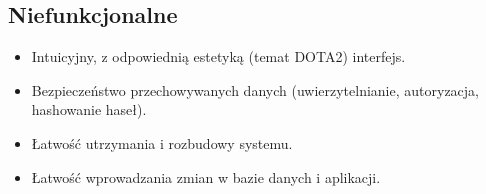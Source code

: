 \subsection{Niefunkcjonalne}
\begin{itemize}
    \item Intuicyjny, z odpowiednią estetyką (temat DOTA2) interfejs.
    \item Bezpieczeństwo przechowywanych danych (uwierzytelnianie, autoryzacja, hashowanie haseł).
    \item Łatwość utrzymania i rozbudowy systemu.
    \item Łatwość wprowadzania zmian w bazie danych i aplikacji.
\end{itemize}
